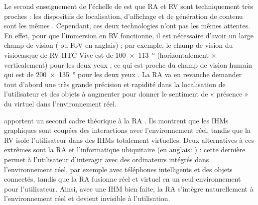 Le second enseignement de l'échelle de \citeauthor{Milgram1994} est que RA et RV sont techniquement très proches : les dispositifs de localisation, d'affichage et de génération de contenu sont les mêmes \citep{Billinghurst2015}. Cependant, ces deux technologies n'ont pas les mêmes attentes. En effet, pour que l'immersion en RV fonctionne, il est nécessaire d'avoir un large champ de vision ( ou FoV en anglais) ; par exemple, le champ de vision du visiocasque de RV HTC Vive est de \SI{100x113}{\degree} (horizontalement $\times$ verticalement) pour les deux yeux \citep{Kreylos2016}, ce qui est proche du champ de vision humain qui est de \SI{200x135}{\degree} pour les deux yeux \citep{ROMANIA_engineer2015}. La RA va en revanche demander tout d'abord une très grande précision et rapidité dans la localisation de l'utilisateur et des objets à augmenter pour donner le sentiment de « présence » du virtuel dans l'environnement réel.


\cite{Rekimoto1995} apportent un second cadre théorique à la RA . Ils montrent que les IHMs graphiques sont coupées des interactions avec l'environnement réel, tandis que la RV isole l'utilisateur dans des IHMs totalement virtuelles. Deux alternatives à ces extrêmes sont la RA et l'informatique ubiquitaire (en anglais: ) : cette dernière permet à l'utilisateur d'interagir avec des ordinateurs intégrés dans l'environnement réel, par exemple avec téléphones intelligents et des objets connectés, tandis que la RA fusionne réel et virtuel en un seul environnement pour l'utilisateur. Ainsi, avec une IHM bien faite, la RA s'intègre naturellement à l'environnement réel et devient invisible à l'utilisation.

